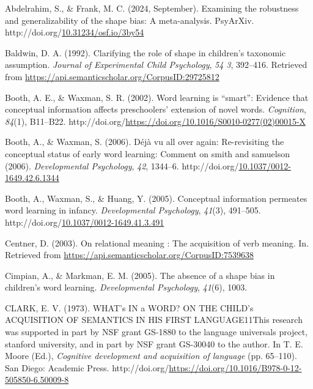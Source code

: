 \documentclass[10pt, letterpaper]{article}
\newenvironment{CSLReferences}%
  {}%
  {\par}
\begin{document}
\hypertarget{refs}{}
\begin{CSLReferences}{1}{0}
\leavevmode{}%
Abdelrahim, S., \& Frank, M. C. (2024, September). Examining the
robustness and generalizability of the shape bias: A meta-analysis.
PsyArXiv.
http://doi.org/\href{https://doi.org/10.31234/osf.io/3by54}{10.31234/osf.io/3by54}

\leavevmode{}%
Baldwin, D. A. (1992). Clarifying the role of shape in children's
taxonomic assumption. \emph{Journal of Experimental Child Psychology},
\emph{54 3}, 392--416. Retrieved from
\url{https://api.semanticscholar.org/CorpusID:29725812}

\leavevmode{}%
Booth, A. E., \& Waxman, S. R. (2002). Word learning is {``smart''}:
Evidence that conceptual information affects preschoolers' extension of
novel words. \emph{Cognition}, \emph{84}(1), B11--B22.
http://doi.org/\url{https://doi.org/10.1016/S0010-0277(02)00015-X}

\leavevmode{}%
Booth, A., \& Waxman, S. (2006). Déjà vu all over again: Re-revisiting
the conceptual status of early word learning: Comment on smith and
samuelson (2006). \emph{Developmental Psychology}, \emph{42}, 1344--6.
http://doi.org/\href{https://doi.org/10.1037/0012-1649.42.6.1344}{10.1037/0012-1649.42.6.1344}

\leavevmode{}%
Booth, A., Waxman, S., \& Huang, Y. (2005). Conceptual information
permeates word learning in infancy. \emph{Developmental Psychology},
\emph{41}(3), 491--505.
http://doi.org/\href{https://doi.org/10.1037/0012-1649.41.3.491}{10.1037/0012-1649.41.3.491}

\leavevmode{}%
Centner, D. (2003). On relational meaning : The acquisition of verb
meaning. In. Retrieved from
\url{https://api.semanticscholar.org/CorpusID:7539638}

\leavevmode{}%
Cimpian, A., \& Markman, E. M. (2005). The absence of a shape bias in
children's word learning. \emph{Developmental Psychology}, \emph{41}(6),
1003.

\leavevmode{}%
CLARK, E. V. (1973). WHAT's IN a WORD? ON THE CHILD's ACQUISITION OF
SEMANTICS IN HIS FIRST LANGUAGE11This research was supported in part by
NSF grant GS-1880 to the language universals project, stanford
university, and in part by NSF grant GS-30040 to the author. In T. E.
Moore (Ed.), \emph{Cognitive development and acquisition of language}
(pp. 65--110). San Diego: Academic Press.
http://doi.org/\url{https://doi.org/10.1016/B978-0-12-505850-6.50009-8}


\end{CSLReferences}
\end{document}
